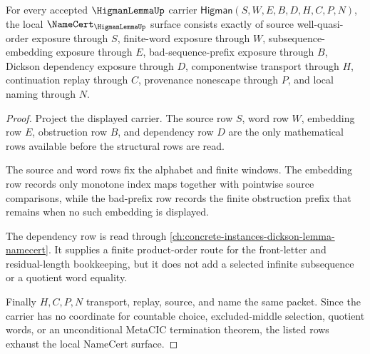 \begin{theorem}
\label{thm:higman-lemma-namecert-obligations}
For every accepted $\HigmanLemmaUp$ carrier $\mathsf{Higman}(S,W,E,B,D,H,C,P,N)$, the local $\NameCert_{\HigmanLemmaUp}$ surface consists exactly of source well-quasi-order exposure through $S$, finite-word exposure through $W$, subsequence-embedding exposure through $E$, bad-sequence-prefix exposure through $B$, Dickson dependency exposure through $D$, componentwise transport through $H$, continuation replay through $C$, provenance nonescape through $P$, and local naming through $N$.
\end{theorem}
\begin{proof}
Project the displayed carrier. The source row $S$, word row $W$, embedding row $E$, obstruction row $B$, and dependency row $D$ are the only mathematical rows available before the structural rows are read.

The source and word rows fix the alphabet and finite windows. The embedding row records only monotone index maps together with pointwise source comparisons, while the bad-prefix row records the finite obstruction prefix that remains when no such embedding is displayed.

The dependency row is read through \autoref{ch:concrete-instances-dickson-lemma-namecert}. It supplies a finite product-order route for the front-letter and residual-length bookkeeping, but it does not add a selected infinite subsequence or a quotient word equality.

Finally $H,C,P,N$ transport, replay, source, and name the same packet. Since the carrier has no coordinate for countable choice, excluded-middle selection, quotient words, or an unconditional MetaCIC termination theorem, the listed rows exhaust the local NameCert surface.
\end{proof}

